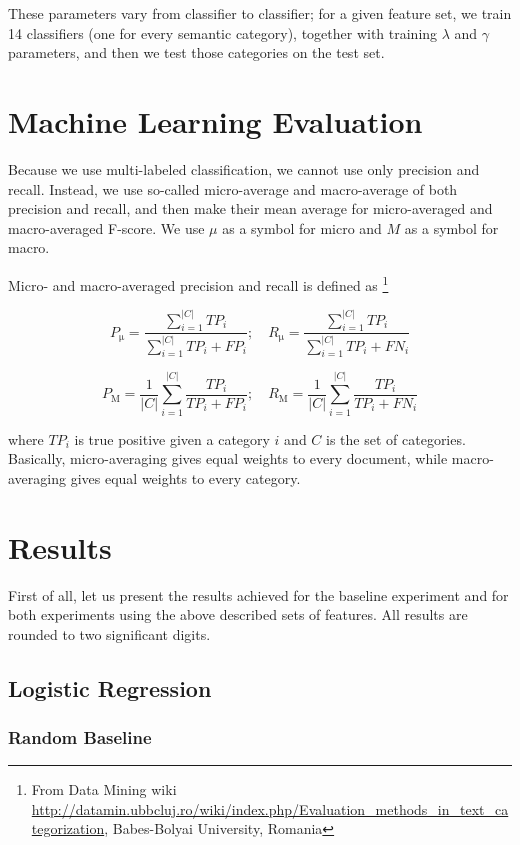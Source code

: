 \documentclass[letterpaper]{article}
\begin{document}
These parameters vary from classifier to classifier; for a given feature set, we train 14 classifiers (one for every semantic category), together with training $\lambda$ and $\gamma$ parameters, and then we test those categories on the test set.

\section{Machine Learning Evaluation}
Because we use multi-labeled classification, we cannot use only precision and recall. Instead, we use so-called micro-average and macro-average of both precision and recall, and then make their mean average for micro-averaged and macro-averaged F-score. We use $\mu$ as a symbol for micro and $M$ as a symbol for macro.

Micro- and macro-averaged precision and recall is defined as \footnote{From Data Mining wiki  \url{http://datamin.ubbcluj.ro/wiki/index.php/Evaluation_methods_in_text_categorization}, Babes-Bolyai University, Romania} 

$$P_{\mathrm{\mu}} = \frac{\sum_{i=1}^{|C|}TP_{i}}{\sum_{i=1}^{|C|}TP_{i}+FP_{i}}; \quad R_{\mathrm{\mu}} = \frac{\sum_{i=1}^{|C|}TP_{i}}{\sum_{i=1}^{|C|}TP_{i}+FN_{i}}$$

$$P_{\mathrm{M}}=\frac{1}{|C|}\sum_{i=1}^{|C|}\frac{TP_{i}}{TP_{i}+FP_{i}};\quad R_{\mathrm{M}}=\frac{1}{|C|}\sum_{i=1}^{|C|}\frac{TP_{i}}{TP_{i}+FN_{i}}$$

where $TP_i$ is true positive given a category $i$ and $C$ is the set of categories. Basically, micro-averaging gives equal weights to every document, while macro-averaging gives equal weights to every category.

\section{Results}
First of all, let us present the results achieved for the baseline experiment and for both experiments using the above described sets of features. 
All results are rounded to two significant digits.

\subsection{Logistic Regression}
\subsubsection{Random Baseline}
\end{document}
